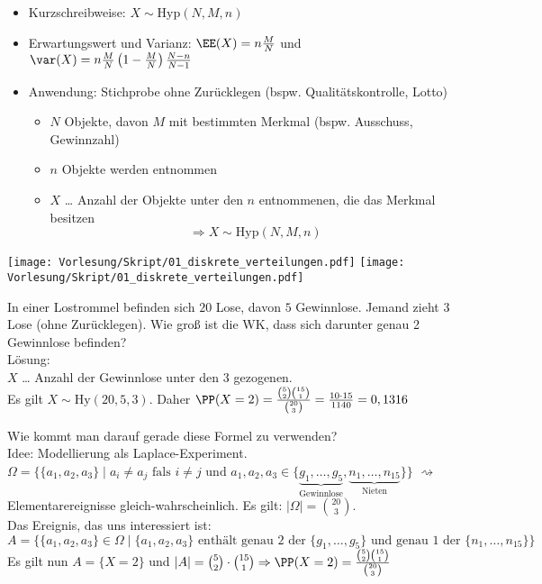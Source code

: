 \documentclass{scrreprt}
\begin{document}
\begin{itemize}
\item Kurzschreibweise: $X\sim \mathrm{Hyp}(N,M,n)$
\item Erwartungswert und Varianz: $\EE(X)=n\frac{M}{N}$ und $\var (X)=n\frac{M}{N}\left(1-\frac{M}{N}\right) \frac{N-n}{N-1}$
\item Anwendung: Stichprobe ohne Zurücklegen (bspw. Qualitätskontrolle, Lotto)
\begin{itemize}
\item $N$ Objekte, davon $M$ mit bestimmten Merkmal (bspw. Ausschuss, Gewinnzahl)
\item $n$ Objekte werden entnommen
\item $X$ … Anzahl der Objekte unter den $n$ entnommenen, die das Merkmal besitzen
$$\Rightarrow X\sim \mathrm{Hyp}(N,M,n)$$
\end{itemize}
\end{itemize}
\begin{center}
\texttt{[image: Vorlesung/Skript/01\_diskrete\_verteilungen.pdf]}
\texttt{[image: Vorlesung/Skript/01\_diskrete\_verteilungen.pdf]}
\end{center}

 In einer Lostrommel befinden sich $20$ Lose, davon $5$ Gewinnlose. Jemand zieht $3$ Lose (ohne Zurücklegen). Wie groß ist die WK, dass sich darunter genau 2 Gewinnlose befinden?\\
Lösung:\\
$X$ … Anzahl der Gewinnlose unter den $3$ gezogenen.\\
Es gilt $X \sim \mathrm{Hy}(20,5,3)$. Daher 
$\PP(X=2)=\frac{\binom{5}{2}\binom{15}{1}}{\binom{20}{3}}=\frac{10 \cdot 15}{1140}=0,1316$

 Wie kommt man darauf gerade diese Formel zu verwenden?\\
Idee: Modellierung als Laplace-Experiment.\\
$\Omega=\{\{a_1,a_2,a_3\}\;|\; a_i \not = a_j \text{ fals } i \not = j \text{ und }a_1, a_2, a_3 \in \{\underbrace{g_1, \dots, g_5}_{\text{Gewinnlose}}, \underbrace{n_1, \dots, n_{15}}_{\text{Nieten}}\}\}$ $\rightsquigarrow $ Elementarereignisse gleich-wahrscheinlich. Es gilt: $|\Omega|=\binom{20}{3}$.\\
Das Ereignis, das uns interessiert ist: \\
$A=\{\{a_1, a_2, a_3\}\in \Omega \;|\; \{a_1, a_2, a_3\} \text{ enthält genau 2 der }\{g_1, \dots,g_5\}\text{ und genau 1 der }\{n_1,\dots,n_{15}\}\}$\\
Es gilt nun $A=\{X=2\}$ und $|A| = \binom{5}{2}\cdot \binom{15}{1} \Rightarrow \PP(X=2) = \frac{\binom{5}{2}\binom{15}{1}}{\binom{20}{3}}$
\end{document}
